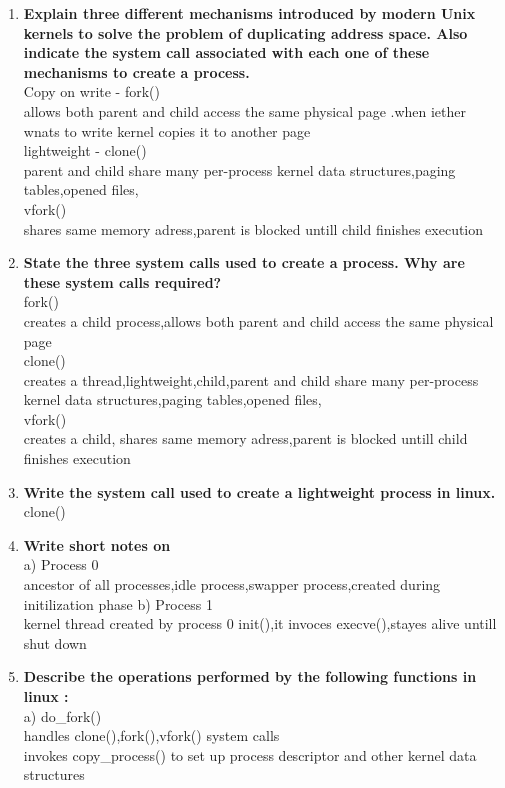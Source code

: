 \documentclass[a4paper,12pt]{article}
\begin{document}
\begin{flushleft}
\begin{enumerate}
\item \textbf{ Explain three different mechanisms introduced by modern Unix kernels to solve the problem of duplicating address space. Also indicate the system call associated with each one of these mechanisms to create a process.}\\
{\color{red} Copy on write - fork()\\ allows both parent and child access the same physical page .when iether wnats to write kernel copies it to another page\\
lightweight - clone()\\
parent and child share many per-process kernel data structures,paging tables,opened files,\\
vfork()\\
shares same memory adress,parent is blocked untill child finishes execution}
\item \textbf{ State the three system calls used to create a process. Why are these system calls required?}\\
{\color{red} fork()\\ creates a child process,allows both parent and child access the same physical page \\
clone()\\
creates a thread,lightweight,child,parent and child share many per-process kernel data structures,paging tables,opened files,\\vfork()\\creates a child,
shares same memory adress,parent is blocked untill child finishes execution}
\item \textbf{ Write the system call used to create a lightweight process in linux.}\\
{\color{red}clone()}
\item \textbf{ Write short notes on}\\
a) Process 0\\
{\color{red}ancestor of all processes,idle process,swapper process,created during initilization phase} b) Process 1\\{\color{red}kernel thread created by process 0 init(),it invoces execve(),stayes alive untill shut down}
\item \textbf{ Describe the operations performed by the following functions in linux :\\}
a) do\_fork()\\{\color{red}handles clone(),fork(),vfork() system calls\\invokes copy\_process() to set up process descriptor and other kernel data structures }

\end{enumerate}
\end{flushleft}
\end{document}
